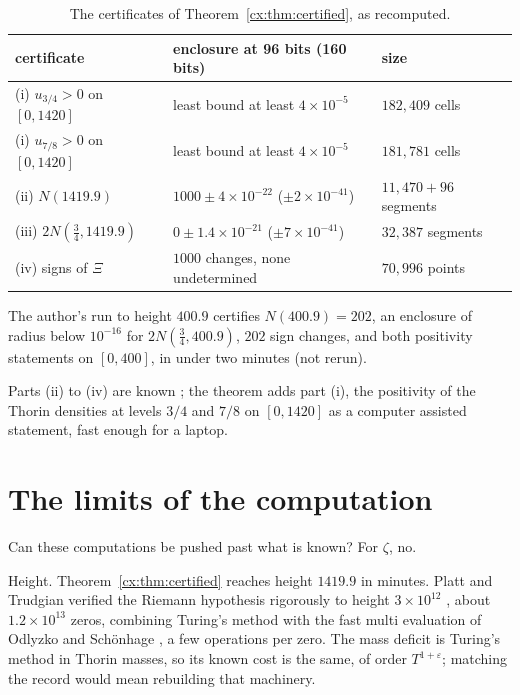 \begin{table}[h]
\centering
\small
\begin{tabular}{lll}
\toprule
certificate & enclosure at 96 bits (160 bits) & size\\
\midrule
(i) $u_{3/4}>0$ on $[0,1420]$ & least bound at least $4\times10^{-5}$ & $182{,}409$ cells\\
(i) $u_{7/8}>0$ on $[0,1420]$ & least bound at least $4\times10^{-5}$ & $181{,}781$ cells\\
(ii) $N(1419.9)$ & $1000\pm4\times10^{-22}$ ($\pm2\times10^{-41}$) & $11{,}470+96$ segments\\
(iii) $2N(\tfrac34,1419.9)$ & $0\pm1.4\times10^{-21}$ ($\pm7\times10^{-41}$) & $32{,}387$ segments\\
(iv) signs of $\Xi$ & $1000$ changes, none undetermined & $70{,}996$ points\\
\bottomrule
\end{tabular}
\caption{The certificates of Theorem~\ref{cx:thm:certified}, as recomputed.}\label{cx:tab:certified}
\end{table}

\noindent The author's run to height $400.9$ certifies $N(400.9)=202$, an enclosure of radius below $10^{-16}$ for $2N(\tfrac34,400.9)$, $202$ sign changes, and both positivity statements on $[0,400]$, in under two minutes (not rerun).

Parts (ii) to (iv) are known \cite{PT21}; the theorem adds part (i), the positivity of the Thorin densities at levels $3/4$ and $7/8$ on $[0,1420]$ as a computer assisted statement, fast enough for a laptop.

\section{The limits of the computation}\label{cx:sec:limits}

Can these computations be pushed past what is known? For $\zeta$, no.

Height. Theorem~\ref{cx:thm:certified} reaches height $1419.9$ in minutes. Platt and Trudgian verified the Riemann hypothesis rigorously to height $3\times10^{12}$ \cite{PT21}, about $1.2\times10^{13}$ zeros, combining Turing's method with the fast multi evaluation of Odlyzko and Sch\"onhage \cite{OS88}, a few operations per zero. The mass deficit is Turing's method in Thorin masses, so its known cost is the same, of order $T^{1+\varepsilon}$; matching the record would mean rebuilding that machinery.

